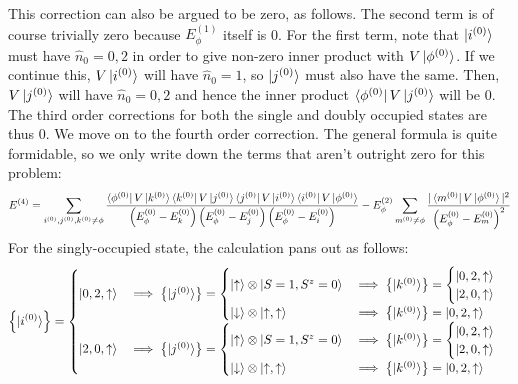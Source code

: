 \documentclass[12pt,twoside]{report}
\numberwithin{equation}{section}
\begin{document}
This correction can also be argued to be zero, as follows. The second term is of course trivially zero because \(E_\phi^{(1)}\) itself is 0. For the first term, note that \(\ket{i^{(0)}}\) must have \(\hat n_0 = 0,2\) in order to give non-zero inner product with \(V\ket{\phi^{(0)}}\). If we continue this, \(V\ket{i^{(0)}}\) will have \(\hat n_0 = 1\), so \(\ket{j^{(0)}}\) must also have the same. Then, \(V\ket{j^{(0)}}\) will have \(\hat n_0 = 0, 2\) and hence the inner product \(\bra{\phi^{(0)}}V\ket{j^{(0)}}\) will be 0. The third order corrections for both the single and doubly occupied states are thus 0.
\pb We move on to the fourth order correction. The general formula is quite formidable, so we only write down the terms that aren't outright zero for this problem:
\begin{equation}\begin{aligned}
	E^{(4)} = \sum_{i^{(0)}, j^{(0)}, k^{(0)}\neq\phi}\frac{\bra{\phi^{(0)}}V\ket{k^{(0)}}\bra{k^{(0)}}V\ket{j^{(0)}}\bra{j^{(0)}}V\ket{i^{(0)}}\bra{i^{(0)}}V\ket{\phi^{(0)}}}{\left(E^{(0)}_\phi - E^{(0)}_k\right)\left(E^{(0)}_\phi - E^{(0)}_j\right)\left(E^{(0)}_\phi - E^{(0)}_i\right)} - E_\phi^{(2)}\sum_{m^{(0)}\neq\phi}\frac{|\bra{m^{(0)}}V\ket{\phi^{(0)}}|^2}{\left(E^{(0)}_\phi - E^{(0)}_m\right)^2}
\end{aligned}\end{equation}
For the singly-occupied state, the calculation pans out as follows:
\begin{equation}\begin{aligned}
	\left\{ \ket{i^{(0)}} \right\} = \begin{cases}
		\ket{0, 2, \uparrow} &\implies \left\{ \ket{j^{(0)}}\right\} = \begin{cases}
			\ket{\uparrow}\otimes\ket{S=1,S^z=0} &\implies \left\{\ket{k^{(0)}}\right\} = \begin{cases}
		\ket{0, 2, \uparrow}	\\
		\ket{2, 0, \uparrow}
		\end{cases}\\
				\ket{\downarrow}\otimes\ket{\uparrow,\uparrow} &\implies \left\{\ket{k^{(0)}}\right\} = \ket{0, 2, \uparrow}\\
	\end{cases} \\
			\ket{2, 0, \uparrow}&\implies \left\{ \ket{j^{(0)}}\right\} = \begin{cases}
			\ket{\uparrow}\otimes\ket{S=1,S^z=0} &\implies \left\{\ket{k^{(0)}}\right\} = \begin{cases}
		\ket{0, 2, \uparrow}	\\
		\ket{2, 0, \uparrow}
		\end{cases}\\
				\ket{\downarrow}\otimes\ket{\uparrow,\uparrow} &\implies \left\{\ket{k^{(0)}}\right\} = \ket{0, 2, \uparrow}\\
	\end{cases} \\
	\end{cases}\\
\end{aligned}\end{equation}
\end{document}
